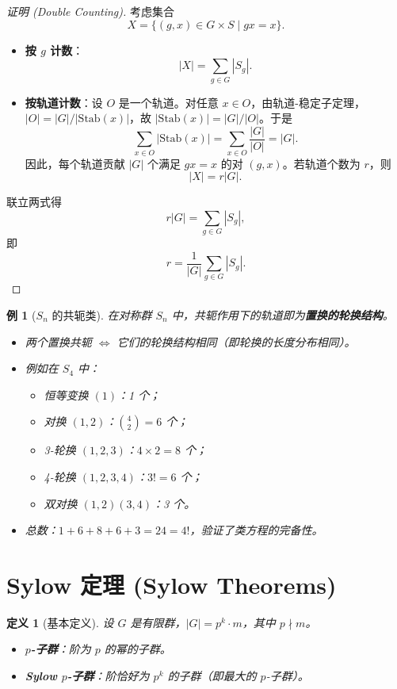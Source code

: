 \documentclass[11pt,a4paper]{ctexart}
\newtheorem*{definition}{定义}
\newtheorem*{example}{例}
\theoremstyle{remark}
\begin{document}
\begin{proof}[证明 (Double Counting)]
考虑集合
\[
X = \{(g, x) \in G \times S \mid gx = x\}.
\]
\begin{itemize}
    \item \textbf{按 \(g\) 计数}：
    \[
    |X| = \sum_{g \in G} |S_g|.
    \]
    \item \textbf{按轨道计数}：设 \(O\) 是一个轨道。对任意 \(x\in O\)，由轨道-稳定子定理，\(|O|=|G|/|\mathrm{Stab}(x)|\)，故 \(|\mathrm{Stab}(x)|=|G|/|O|\)。于是
    \[
    \sum_{x \in O} |\mathrm{Stab}(x)|
    = \sum_{x \in O} \frac{|G|}{|O|}
    = |G|.
    \]
    因此，每个轨道贡献 \(|G|\) 个满足 \(gx=x\) 的对 \((g,x)\)。若轨道个数为 \(r\)，则
    \[
    |X| = r|G|.
    \]
\end{itemize}
联立两式得
\[
r|G| = \sum_{g \in G} |S_g|,
\]
即
\[
r = \frac{1}{|G|} \sum_{g \in G} |S_g|.
\]
\end{proof}

\begin{example}[\(S_n\) 的共轭类]
在对称群 \(S_n\) 中，共轭作用下的轨道即为\textbf{置换的轮换结构}。
\begin{itemize}
    \item 两个置换共轭 \(\iff\) 它们的轮换结构相同（即轮换的长度分布相同）。
    \item 例如在 \(S_4\) 中：
    \begin{itemize}
        \item 恒等变换 \((1)\)：1 个；
        \item 对换 \((1,2)\)：\(\binom{4}{2}=6\) 个；
        \item 3-轮换 \((1,2,3)\)：\(4 \times 2 = 8\) 个；
        \item 4-轮换 \((1,2,3,4)\)：\(3! = 6\) 个；
        \item 双对换 \((1,2)(3,4)\)：3 个。
    \end{itemize}
    \item 总数：\(1+6+8+6+3 = 24 = 4!\)，验证了类方程的完备性。
\end{itemize}
\end{example}

\section*{Sylow 定理 (Sylow Theorems)}

\begin{definition}[基本定义]
设 \(G\) 是有限群，\(|G| = p^k \cdot m\)，其中 \(p \nmid m\)。
\begin{itemize}
    \item \textbf{\(p\)-子群}：阶为 \(p\) 的幂的子群。
    \item \textbf{Sylow \(p\)-子群}：阶恰好为 \(p^k\) 的子群（即最大的 \(p\)-子群）。
\end{itemize}
\end{definition}
\end{document}
